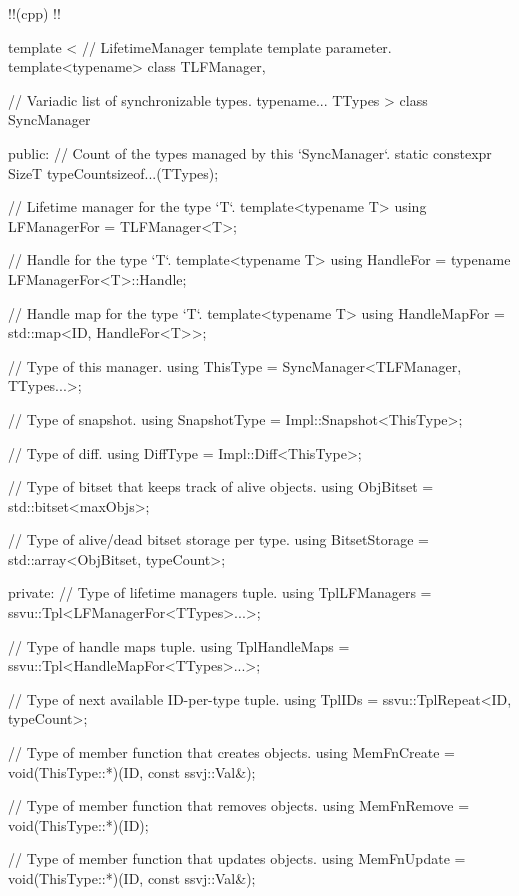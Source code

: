 \documentclass{report}
\begin{document}
!!(cpp)    
!!{
    template
    <
        // LifetimeManager template template parameter.
        template<typename> class TLFManager, 

        // Variadic list of synchronizable types.
        typename... TTypes
    > 
    class SyncManager
    {
        public:
            // Count of the types managed by this `SyncManager`.
            static constexpr SizeT typeCount{sizeof...(TTypes)};

            // Lifetime manager for the type `T`.
            template<typename T> using LFManagerFor = TLFManager<T>;

            // Handle for the type `T`.
            template<typename T> using HandleFor = typename LFManagerFor<T>::Handle;

            // Handle map for the type `T`.
            template<typename T> using HandleMapFor = std::map<ID, HandleFor<T>>;

            // Type of this manager.
            using ThisType = SyncManager<TLFManager, TTypes...>;

            // Type of snapshot.
            using SnapshotType = Impl::Snapshot<ThisType>;

            // Type of diff.
            using DiffType = Impl::Diff<ThisType>;

            // Type of bitset that keeps track of alive objects.
            using ObjBitset = std::bitset<maxObjs>;

            // Type of alive/dead bitset storage per type.
            using BitsetStorage = std::array<ObjBitset, typeCount>;

        private:
            // Type of lifetime managers tuple.
            using TplLFManagers = ssvu::Tpl<LFManagerFor<TTypes>...>;

            // Type of handle maps tuple.
            using TplHandleMaps = ssvu::Tpl<HandleMapFor<TTypes>...>;

            // Type of next available ID-per-type tuple.
            using TplIDs = ssvu::TplRepeat<ID, typeCount>;

            // Type of member function that creates objects.
            using MemFnCreate = void(ThisType::*)(ID, const ssvj::Val&);

            // Type of member function that removes objects.
            using MemFnRemove = void(ThisType::*)(ID);

            // Type of member function that updates objects.
            using MemFnUpdate = void(ThisType::*)(ID, const ssvj::Val&);

}}
\end{document}
